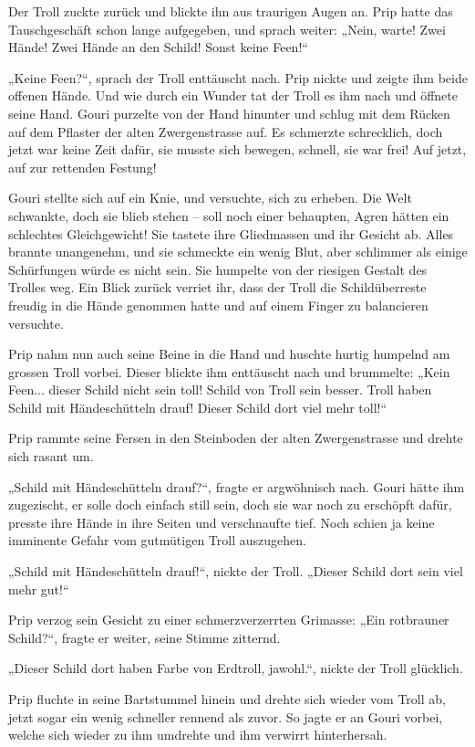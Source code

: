 Der Troll zuckte zurück und blickte ihn aus traurigen Augen an. Prip hatte das Tauschgeschäft schon lange aufgegeben, und sprach weiter: „Nein, warte! Zwei Hände! Zwei Hände an den Schild! Sonst keine Feen!“

„Keine Feen?“, sprach der Troll enttäuscht nach. Prip nickte und zeigte ihm beide offenen Hände. Und wie durch ein Wunder tat der Troll es ihm nach und öffnete seine Hand. Gouri purzelte von der Hand hinunter und schlug mit dem Rücken auf dem Pflaster der alten Zwergenstrasse auf. Es schmerzte schrecklich, doch jetzt war keine Zeit dafür, sie musste sich bewegen, schnell, sie war frei! Auf jetzt, auf zur rettenden Festung!

Gouri stellte sich auf ein Knie, und versuchte, sich zu erheben. Die Welt schwankte, doch sie blieb stehen – soll noch einer behaupten, Agren hätten ein schlechtes Gleichgewicht! Sie tastete ihre Gliedmassen und ihr Gesicht ab. Alles brannte unangenehm, und sie schmeckte ein wenig Blut, aber schlimmer als einige Schürfungen würde es nicht sein. Sie humpelte von der riesigen Gestalt des Trolles weg. Ein Blick zurück verriet ihr, dass der Troll die Schildüberreste freudig in die Hände genommen hatte und auf einem Finger zu balancieren versuchte.

Prip nahm nun auch seine Beine in die Hand und huschte hurtig humpelnd am grossen Troll vorbei. Dieser blickte ihm enttäuscht nach und brummelte: „Kein Feen... dieser Schild nicht sein toll! Schild von Troll sein besser. Troll haben Schild mit Händeschütteln drauf! Dieser Schild dort viel mehr toll!“

Prip rammte seine Fersen in den Steinboden der alten Zwergenstrasse und drehte sich rasant um.

„Schild mit Händeschütteln drauf?“, fragte er argwöhnisch nach. Gouri hätte ihm zugezischt, er solle doch einfach still sein, doch sie war noch zu erschöpft dafür, presste ihre Hände in ihre Seiten und verschnaufte tief. Noch schien ja keine imminente Gefahr vom gutmütigen Troll auszugehen.

„Schild mit Händeschütteln drauf!“, nickte der Troll. „Dieser Schild dort sein viel mehr gut!“

Prip verzog sein Gesicht zu einer schmerzverzerrten Grimasse: „Ein rotbrauner Schild?“, fragte er weiter, seine Stimme zitternd.

„Dieser Schild dort haben Farbe von Erdtroll, jawohl.“, nickte der Troll glücklich.

Prip fluchte in seine Bartstummel hinein und drehte sich wieder vom Troll ab, jetzt sogar ein wenig schneller rennend als zuvor. So jagte er an Gouri vorbei, welche sich wieder zu ihm umdrehte und ihm verwirrt hinterhersah.

